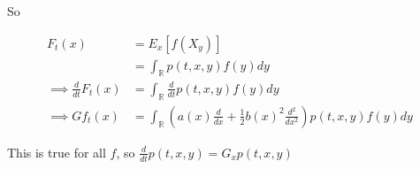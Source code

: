\documentclass{article}
\begin{document}
So

\begin{align}
    F_t(x) &= E_x[f(X_y)] \\
    &= \int_{\mathbb{R}} p(t,x,y)f(y)dy \\
    \implies \frac{d}{dt}F_t(x) &= \int_{\mathbb{R}}\frac{d}{dt}p(t,x,y)f(y)dy \\
    \implies Gf_t(x) &= \int_{\mathbb{R}} \left( a(x)\frac{d}{dx} + \frac{1}{2}b(x)^2\frac{d^2}{dx^2}\right) p(t,x,y)f(y)dy
\end{align}

This is true for all $f$, so $\frac{d}{dt}p(t,x,y) = G_x p(t,x,y)$
\end{document}
